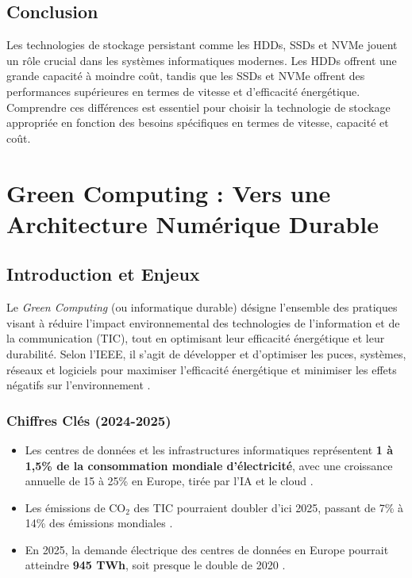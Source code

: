 \documentclass[10pt,a4paper]{article}
\begin{document}
\subsection*{Conclusion}
Les technologies de stockage persistant comme les HDDs, SSDs et NVMe jouent un rôle crucial dans les systèmes informatiques modernes. Les HDDs offrent une grande capacité à moindre coût, tandis que les SSDs et NVMe offrent des performances supérieures en termes de vitesse et d'efficacité énergétique. Comprendre ces différences est essentiel pour choisir la technologie de stockage appropriée en fonction des besoins spécifiques en termes de vitesse, capacité et coût.

\section{Green Computing : Vers une Architecture Numérique Durable}

\subsection{Introduction et Enjeux}
Le \textit{Green Computing} (ou informatique durable) désigne l'ensemble des pratiques visant à réduire l'impact environnemental des technologies de l'information et de la communication (TIC), tout en optimisant leur efficacité énergétique et leur durabilité. Selon l'IEEE, il s'agit de développer et d'optimiser les puces, systèmes, réseaux et logiciels pour maximiser l'efficacité énergétique et minimiser les effets négatifs sur l'environnement \cite{ieee2025}.

\subsubsection{Chiffres Clés (2024-2025)}
\begin{itemize}
    \item Les centres de données et les infrastructures informatiques représentent \textbf{1 à 1,5\% de la consommation mondiale d'électricité}, avec une croissance annuelle de 15 à 25\% en Europe, tirée par l'IA et le cloud \cite{gresb2025}.
    \item Les émissions de CO$_2$ des TIC pourraient doubler d'ici 2025, passant de 7\% à 14\% des émissions mondiales \cite{nyabuto2024}.
    \item En 2025, la demande électrique des centres de données en Europe pourrait atteindre \textbf{945 TWh}, soit presque le double de 2020 \cite{gresb2025}.
\end{itemize}
\end{document}
